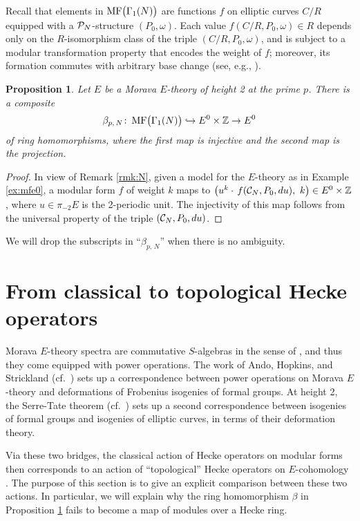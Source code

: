 \documentclass{gtpart}
\newtheorem{prop}[thm]{Proposition}
\theoremstyle{definition}
\theoremstyle{remark}
\def\co{\colon\thinspace}
\newcommand{\mb}[1]{\mathbb{#1}}
\newcommand{\CC}{{\cal C}}
\newcommand{\CP}{{\cal P}}
\newcommand{\BZ}{{\mb Z}}
\newcommand{\MF}{{\rm MF}}
\newcommand{\B}{\beta}
\newcommand{\G}{\Gamma}
\renewcommand{\=}{\approx}
\renewcommand{\-}{\sim}
\numberwithin{equation}{section}
\numberwithin{thm}{section}
\begin{document}
Recall that elements in $\MF\big(\G_1(N)\big)$ are functions $f$ on elliptic curves $C/R$ equipped with a $\CP_N$-structure $(P_0,\omega)$.  
Each value $f(C/R, P_0, \omega) \in R$ 
depends only on the $R$-isomorphism class of the triple $(C/R, P_0, \omega)$, 
and is subject to a modular transformation property that encodes the weight of $f$; moreover, its formation commutes with arbitrary base change 
(see, e.g., \cite[Section 1.2]{padicprop}).  
\begin{prop}
 \label{prop:mfe0}
 Let $E$ be a Morava $E$-theory of height 2 at the prime $p$.  
 There is a composite 
 \[
  \B_{p,\,N} \co \MF\big(\G_1(N)\big) \hookrightarrow E^0 \times \BZ \to E^0 
 \]
 of ring homomorphisms, 
 where the first map is injective and the second map is the projection.  
\end{prop}
\begin{proof}
 In view of Remark \ref{rmk:N}, given a model for the $E$-theory as in Example \ref{ex:mfe0}, 
 a modular form $f$ of weight $k$ maps to $\big( u^k \cdot \, f(\CC_N, P_0, du), ~ k \big) \in E^0 \times \BZ$, where $u \in \pi_{-2} E$ is the 2-periodic unit.  
 The injectivity of this map follows from the universal property of the triple $(\CC_N, P_0, du)$.  
\end{proof}

We will drop the subscripts in ``$\B_{p,\,N}$'' when there is no ambiguity.  



\section{From classical to topological Hecke operators}
\label{sec:ct}

Morava $E$-theory spectra are commutative $S$-algebras in the sense of \cite{EKMM}, and thus they come equipped with power operations.  
The work of Ando, Hopkins, and Strickland \cite{AHS04} (cf.~\cite[Theorem B]{cong}) sets up a correspondence 
between power operations on Morava $E$-theory and deformations of Frobenius isogenies of formal groups.  
At height 2, the Serre-Tate theorem \cite{LST} (cf.~\cite[Theorem 2.9.1]{KM}) sets up a second correspondence between isogenies of formal groups and isogenies of elliptic curves, in terms of their deformation theory.  

Via these two bridges, the classical action of Hecke operators on modular forms then corresponds to an action of ``topological'' Hecke operators on $E$-cohomology \cite[Section 14]{log}.  
The purpose of this section is to give an explicit comparison between these two actions.  
In particular, we will explain why the ring homomorphism $\B$ in Proposition \ref{prop:mfe0} fails to become a map of modules over a Hecke ring.  
\end{document}
